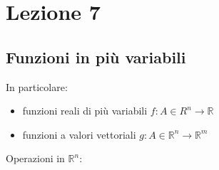 \documentclass[../appunti-analisi.tex]{subfiles}
\begin{document}
\section{Lezione 7}

\subsection{Funzioni in più variabili}

In particolare:

\begin{itemize}
    \item funzioni reali di più variabili $f: A \in R^{n} \rightarrow \mathbb{R}$
    \item funzioni a valori vettoriali $g: A \in \mathbb{R}^{n}\rightarrow \mathbb{R}^{m}$
\end{itemize}




Operazioni in $\mathbb{R}^{n}$:
\end{document}
